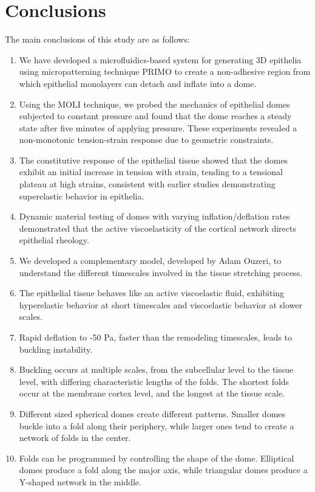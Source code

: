 
\hypertarget{conclusions}{%
	\section{Conclusions}\label{conclusions}}

The main conclusions of this study are as follows:

\begin{enumerate}
	\def\labelenumi{\arabic{enumi}.}
	\item
	We have developed a microfluidics-based system for generating 3D
	epithelia using micropatterning technique PRIMO to create a
	non-adhesive region from which epithelial monolayers can detach and
	inflate into a dome.
	\item
	Using the MOLI technique, we probed the mechanics of epithelial domes
	subjected to constant pressure and found that the dome reaches a
	steady state after five minutes of applying pressure. These
	experiments revealed a non-monotonic tension-strain response due to
	geometric constraints.
	\item
	The constitutive response of the epithelial tissue showed that the
	domes exhibit an initial increase in tension with strain, tending to a
	tensional plateau at high strains, consistent with earlier studies
	demonstrating superelastic behavior in epithelia.
	\item
	Dynamic material testing of domes with varying inflation/deflation
	rates demonstrated that the active viscoelasticity of the cortical
	network directs epithelial rheology.
	\item
	We developed a complementary model, developed by Adam Ouzeri, to
	understand the different timescales involved in the tissue stretching
	process.
	\item
	The epithelial tissue behaves like an active viscoelastic fluid,
	exhibiting hyperelastic behavior at short timescales and viscoelastic
	behavior at slower scales.
	\item
	Rapid deflation to -50 Pa, faster than the remodeling timescales,
	leads to buckling instability.
	\item
	Buckling occurs at multiple scales, from the subcellular level to the
	tissue level, with differing characteristic lengths of the folds. The
	shortest folds occur at the membrane cortex level, and the longest at
	the tissue scale.
	\item
	Different sized spherical domes create different patterns. Smaller
	domes buckle into a fold along their periphery, while larger ones tend
	to create a network of folds in the center.
	\item
	Folds can be programmed by controlling the shape of the dome.
	Elliptical domes produce a fold along the major axis, while triangular
	domes produce a Y-shaped network in the middle.
\end{enumerate}

